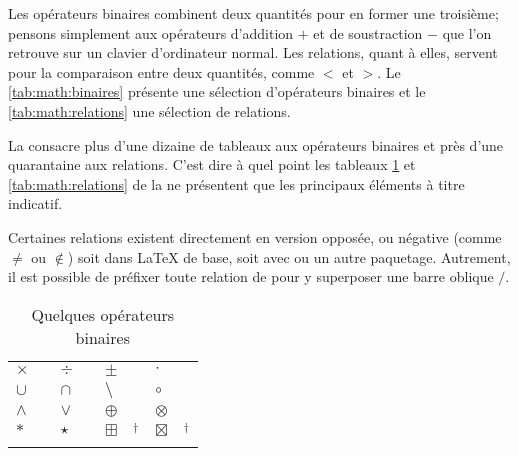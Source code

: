 Les opérateurs binaires combinent deux quantités pour en former une
troisième; pensons simplement aux opérateurs d'addition $+$ et de
soustraction $-$ que l'on retrouve sur un clavier d'ordinateur normal.
Les relations, quant à elles, servent pour la comparaison entre deux
quantités, comme $<$ et $>$. Le \autoref{tab:math:binaires}
présente une sélection d'opérateurs binaires et
le \autoref{tab:math:relations}  une sélection de relations.

La %
consacre plus d'une dizaine de tableaux aux opérateurs binaires et
près d'une quarantaine aux relations. C'est dire à quel point les
tableaux \ref*{tab:math:binaires} et \ref*{tab:math:relations} de la
 ne présentent que les principaux
éléments à titre indicatif.

Certaines relations existent directement en version opposée, ou
négative (comme $\neq$ ou $\notin$) soit dans {\LaTeX} de base, soit
avec  ou un autre paquetage. Autrement, il est possible
de préfixer toute relation de \cmd{\not} pour y superposer une barre
oblique $/$.

\begin{table}
  \caption{Quelques opérateurs binaires}
  \label{tab:math:binaires}
  \begin{tabularx}{1.0\linewidth}{lXlXlXlX}
    $\times$    & \cmd{\times} &
    $\div$      & \cmd{\div}   &
    $\pm$       & \cmd{\pm}    &
    $\cdot$     & \cmd{\cdot}    \\
    $\cup$      & \cmd{\cup} &
    $\cap$      & \cmd{\cap} &
    $\setminus$ & \cmd{\setminus} &
    $\circ$     & \cmd{\circ}  \\
    $\wedge$    & \cmd{\wedge} &
    $\vee$      & \cmd{\vee} &
    $\oplus$    & \cmd{\oplus} &
    $\otimes$   & \cmd{\otimes} \\
    $\ast$      & \cmd{\ast} &
    $\star$     & \cmd{\star} &
    $\boxplus$  & \cmd{\boxplus}$^\dagger$ &
    $\boxtimes$ & \cmd{\boxtimes}$^\dagger$ \\
    \addlinespace
  \end{tabularx}
\end{table}

